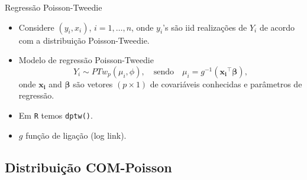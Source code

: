 \documentclass[10pt, aspectratio=169]{beamer}\usepackage[]{graphicx}\usepackage[]{color}
\begin{document}

\begin{frame}{Regressão Poisson-Tweedie}
\begin{itemize}
\item Considere $(y_i, x_i)$, $i = 1,\ldots, n$, onde $y_i$'s são iid 
realizações de $Y_i$ de acordo com a distribuição Poisson-Tweedie.
\vspace{0,5cm}
\item Modelo de regressão Poisson-Tweedie
$$Y_i \sim PTw_{p}(\mu_i, \phi), \quad  \text{sendo} \quad 
\mu_i = g^{-1}(\boldsymbol{x_i}^{\top} \boldsymbol{\beta}),$$
onde $\boldsymbol{x_i}$ and $\boldsymbol{\beta}$ são vetores $(p \times 1)$
de covariáveis conhecidas e parâmetros de regressão.
\vspace{0,5cm}
\item Em \texttt{R} temos \texttt{dptw()}.
\item $g$ função de ligação (log link).
\end{itemize}
\end{frame}

\subsection{Distribuição COM-Poisson}
\end{document}
